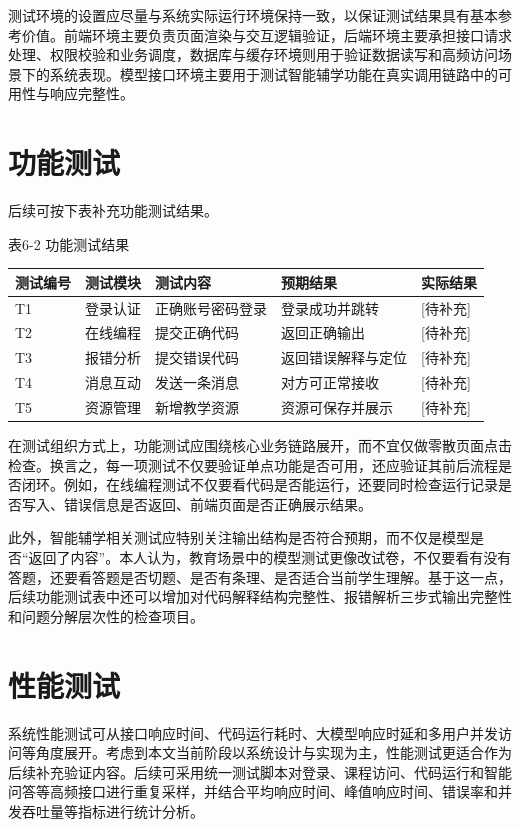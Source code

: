 测试环境的设置应尽量与系统实际运行环境保持一致，以保证测试结果具有基本参考价值。前端环境主要负责页面渲染与交互逻辑验证，后端环境主要承担接口请求处理、权限校验和业务调度，数据库与缓存环境则用于验证数据读写和高频访问场景下的系统表现。模型接口环境主要用于测试智能辅学功能在真实调用链路中的可用性与响应完整性。

\section{功能测试}\label{ux529fux80fdux6d4bux8bd5}

后续可按下表补充功能测试结果。

表6-2 功能测试结果

\begin{longtable}[]{@{}lllll@{}}
\toprule\noalign{}
测试编号 & 测试模块 & 测试内容 & 预期结果 & 实际结果 \\
\midrule\noalign{}
\endhead
\bottomrule\noalign{}
\endlastfoot
T1 & 登录认证 & 正确账号密码登录 & 登录成功并跳转 & {[}待补充{]} \\
T2 & 在线编程 & 提交正确代码 & 返回正确输出 & {[}待补充{]} \\
T3 & 报错分析 & 提交错误代码 & 返回错误解释与定位 & {[}待补充{]} \\
T4 & 消息互动 & 发送一条消息 & 对方可正常接收 & {[}待补充{]} \\
T5 & 资源管理 & 新增教学资源 & 资源可保存并展示 & {[}待补充{]} \\
\end{longtable}

在测试组织方式上，功能测试应围绕核心业务链路展开，而不宜仅做零散页面点击检查。换言之，每一项测试不仅要验证单点功能是否可用，还应验证其前后流程是否闭环。例如，在线编程测试不仅要看代码是否能运行，还要同时检查运行记录是否写入、错误信息是否返回、前端页面是否正确展示结果。

此外，智能辅学相关测试应特别关注输出结构是否符合预期，而不仅是模型是否``返回了内容''。本人认为，教育场景中的模型测试更像改试卷，不仅要看有没有答题，还要看答题是否切题、是否有条理、是否适合当前学生理解。基于这一点，后续功能测试表中还可以增加对代码解释结构完整性、报错解析三步式输出完整性和问题分解层次性的检查项目。

\section{性能测试}\label{ux6027ux80fdux6d4bux8bd5}

系统性能测试可从接口响应时间、代码运行耗时、大模型响应时延和多用户并发访问等角度展开。考虑到本文当前阶段以系统设计与实现为主，性能测试更适合作为后续补充验证内容。后续可采用统一测试脚本对登录、课程访问、代码运行和智能问答等高频接口进行重复采样，并结合平均响应时间、峰值响应时间、错误率和并发吞吐量等指标进行统计分析。

